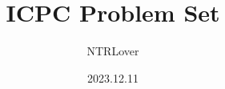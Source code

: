\documentclass[a4paper]{report}
\begin{document}

\title{ICPC Problem Set}
\author{NTRLover}
\date{2023.12.11}

\maketitle




\end{document}
